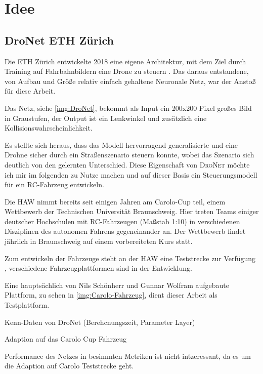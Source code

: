 %
\chapter{Idee}

\section{DroNet ETH Zürich}

Die ETH Zürich entwickelte 2018 eine eigene Architektur, mit dem Ziel durch Training auf Fahrbahnbildern eine Drone zu steuern \cite{loquercio2018dronet}. 
Das daraus entstandene, von Aufbau und Größe relativ einfach gehaltene Neuronale Netz, war der Anstoß für diese Arbeit. 

Das Netz, siehe \ref{img:DroNet}, bekommt als Input ein 200x200 Pixel großes Bild in Graustufen, der Output ist ein Lenkwinkel und zusätzlich eine Kollisionswahrscheinlichkeit.

Es stellte sich heraus, dass das Modell hervorragend generalisierte und eine Drohne sicher durch ein Straßenszenario steuern konnte, wobei das Szenario sich deutlich von den gelernten Unterschied. Diese Eigenschaft von \textsc{DroNet} möchte ich mir im folgenden zu Nutze machen und auf dieser Basis ein Steuerungsmodell für ein RC-Fahrzeug entwickeln.

Die HAW nimmt bereits seit einigen Jahren am \glqq Carolo-Cup \grqq{} teil, einem Wettbewerb der Technischen Universität Braunschweig. Hier treten Teams einiger deutscher Hochschulen mit RC-Fahrzeugen (Maßstab 1:10) in verschiedenen Disziplinen des autonomen Fahrens gegeneinander an. Der Wettbewerb findet jährlich in Braunschweig auf einem vorbereiteten Kurs statt.

Zum entwickeln der Fahrzeuge steht an der HAW eine Teststrecke zur Verfügung , verschiedene Fahrzeugplattformen sind in der Entwicklung.

Eine hauptsächlich von Nils Schönherr und Gunnar Wolfram aufgebaute Plattform, zu sehen in \ref{img:Carolo-Fahrzeug}, dient dieser Arbeit als Testplattform.



Kenn-Daten von DroNet (Berehcnungszeit, Parameter Layer)


Adaption auf das Carolo Cup Fahrzeug

Performance des Netzes in besimmten Metriken ist nicht intzeressant, da es um die Adaption auf Carolo Teststrecke geht.

